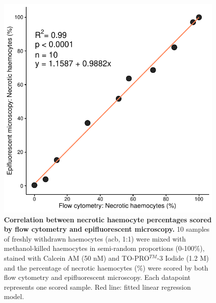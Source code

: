 \begin{figure}[b]
    \centering
    \includegraphics[width=.5\textwidth]{figures/Method development/FCM EM linreg final.pdf}
    \caption{\textbf{Correlation between necrotic haemocyte percentages scored by flow cytometry and epifluorescent microscopy.} 10 samples of freshly withdrawn haemocytes (\acrshort{acb}, 1:1) were mixed with methanol-killed haemocytes in semi-random proportions (0-100\%), stained with Calcein AM (50 nM) and TO-PRO$^{TM}$-3 Iodide (1.2 \micro M) and the percentage of necrotic haemocytes (\%) were scored by both flow cytometry and epifluorescent microscopy. Each datapoint represents one scored sample. Red line: fitted linear regression model.}
    \label{fig:method_val_1}
\end{figure}

